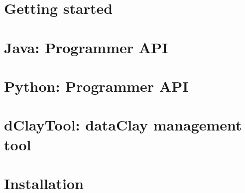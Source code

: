 \documentclass[11pt,fleqn]{book} %
\begin{document}
\tableofcontents %

\cleardoublepage %

\pagestyle{fancy} %

\renewcommand\labelitemi{}
\setlength{\parindent}{0pt}



\part{Getting started}
  
  
  

\part{Java: Programmer API}
  
%  
%  

\part{Python: Programmer API}
  
%  
%  
%  

\part{dClayTool: dataClay management tool}
  

%  
%  
%  

\part{Installation}
\label{part:installation}
  
  
  
\end{document}
